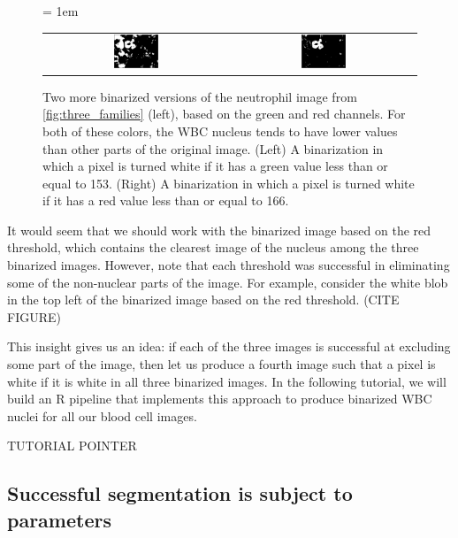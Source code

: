 \begin{figure}[h]
\centering
 \tabcolsep = 1em
\mySfFamily
\begin{tabular}{c c}
\includegraphics[width = 0.25\textwidth]{../images/neutrophil_binarized_green.png} & \includegraphics[width = 0.25\textwidth]{../images/neutrophil_binarized_red.png}
\end{tabular}
\caption{Two more binarized versions of the neutrophil image from \autoref{fig:three_families} (left), based on the green and red channels. For both of these colors, the WBC nucleus tends to have lower values than other parts of the original image. (Left) A binarization in which a pixel is turned white if it has a green value less than or equal to 153. (Right) A binarization in which a pixel is turned white if it has a red value less than or equal to 166.}
\label{fig:neutrophil_binarized_other_colors}
\end{figure}

It would seem that we should work with the binarized image based on the red threshold, which contains the clearest image of the nucleus among the three binarized images. However, note that each threshold was successful in eliminating some of the non-nuclear parts of the image. For example, consider the white blob in the top left of the binarized image based on the red threshold. (CITE FIGURE)

This insight gives us an idea: if each of the three images is successful at excluding some part of the image, then let us produce a fourth image such that a pixel is white if it is white in all three binarized images. In the following tutorial, we will build an R pipeline that implements this approach to produce binarized WBC nuclei for all our blood cell images.

TUTORIAL POINTER

\FloatBarrier
{}
\subsection{Successful segmentation is subject to parameters}

